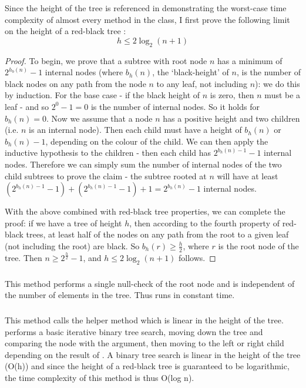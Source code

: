 Since the height of the tree is referenced in demonstrating the worst-case time complexity of almost every method in the class, I first prove the following limit on the height of a red-black tree \cite{clrs}:
\begin{equation*}
h \leq 2\log_2(n+1)
\end{equation*}
\begin{proof}
To begin, we prove that a subtree with root node $n$ has a minimum of $2^{h_b(n)} - 1$ internal nodes (where $b_h(n)$, the `black-height' of $n$, is the number of black nodes on any path from the node $n$ to any leaf, not including $n$): we do this by induction. For the base case - if the black height of $n$ is zero, then $n$ must be a leaf - and so $2^0 - 1 = 0$ is the number of internal nodes. So it holds for $b_h(n) = 0$. Now we assume that a node $n$ has a positive height and two children (i.e. $n$ is an internal node). Then each child must have a height of $b_h(n)$ or $b_h(n) - 1$, depending on the colour of the child. We can then apply the inductive hypothesis to the children - then each child has $2^{b_h(n) - 1} - 1$ internal nodes. Therefore we can simply sum the number of internal nodes of the two child subtrees to prove the claim - the subtree rooted at $n$ will have at least $(2^{b_h(n) - 1} - 1) + (2^{b_h(n) - 1} - 1) + 1 = 2^{b_h(n)} - 1$ internal nodes.

With the above combined with red-black tree properties, we can complete the proof: if we have a tree of height $h$, then according to the fourth property of red-black trees, at least half of the nodes on any path from the root to a given leaf (not including the root) are black. So $b_h(r) \geq \frac{h}{2}$, where $r$ is the root node of the tree. Then $n \geq 2^{\frac h 2} - 1$, and $h \leq 2\log_2(n + 1)$ follows.
\end{proof}

\subsubsection{}
This method performs a single null-check of the root node and is independent of the number of elements in the tree. Thus  runs in constant time.

\subsubsection{}
This method calls the helper method  which is linear in the height of the tree.  performs a basic iterative binary tree search, moving down the tree and comparing the node with the argument, then moving to the left or right child depending on the result of . A binary tree search is linear in the height of the tree (O(h)) and since the height of a red-black tree is guaranteed to be logarithmic, the time complexity of this method is thus O(log n).



